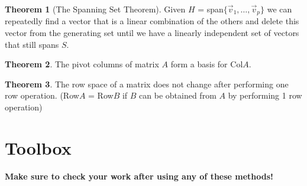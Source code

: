 \documentclass[a4paper,12pt]{article}
\theoremstyle{definition}
\newtheorem{theorem}{Theorem}
\theoremstyle{definition}
\newcommand{\finitevecs}[2]{#1_1,\ldots,#1_#2}
\newcommand{\finitevecsset}[2]{\{\finitevecs{#1}{#2}\}}
\begin{document}
	\begin{theorem}[The Spanning Set Theorem]
		\label{thm:spanning-set-thm}
		Given $H$ = span$\finitevecsset{\vec{v}}{p}$ we can repeatedly find a vector that is a linear combination of the others and delete this vector from the generating set until we have a linearly independent set of vectors that still spans $S$.
	\end{theorem}
	
	\begin{theorem}
		\label{thm:basis-col-space-thm}
		The pivot columns of matrix $A$ form a basis for Col$A$.
	\end{theorem}
	
	\begin{theorem}
		\label{thm:row-space-equiv-thm}
		The row space of a matrix does not change after performing one row operation. (Row$A$ = Row$B$ if $B$ can be obtained from $A$ by performing 1 row operation)
	\end{theorem}
	\newpage
	
	\section{Toolbox}
	\textbf{Make sure to check your work after using any of these methods!}
	
\end{document}
